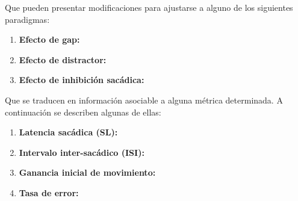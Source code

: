 \documentclass[../main.tex]{subfiles}
\begin{document}
		 Que pueden presentar modificaciones para ajustarse a alguno de los siguientes paradigmas:
		 \begin{enumerate}
		 	\item \textbf{Efecto de gap:}

		 	\item \textbf{Efecto de distractor:}

		 	\item \textbf{Efecto de inhibición sacádica:}

		 \end{enumerate}


		 Que se traducen en información asociable a alguna métrica determinada. A continuación se describen algunas de ellas:
		 \begin{enumerate}
		 	\item \textbf{Latencia sacádica (SL):}

		 	\item \textbf{Intervalo inter-sacádico (ISI):}
		 	
		 	\item \textbf{Ganancia inicial de movimiento:}
		 	
		 	\item \textbf{Tasa de error:}

		 \end{enumerate} 
\end{document}
